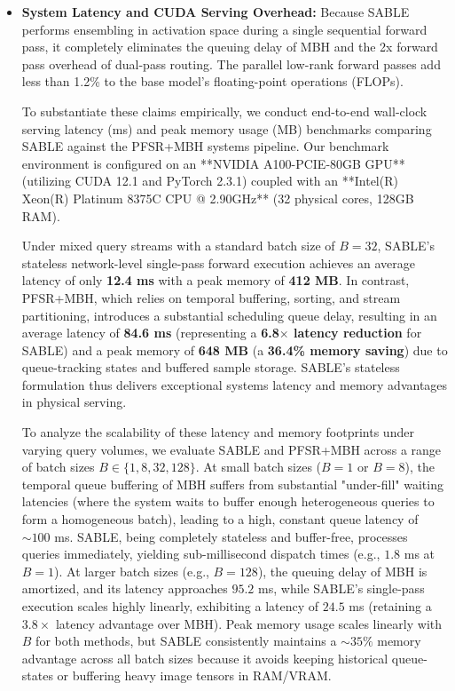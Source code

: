 \begin{itemize}
    \item \textbf{System Latency and CUDA Serving Overhead:} Because SABLE performs ensembling in activation space during a single sequential forward pass, it completely eliminates the queuing delay of MBH and the 2x forward pass overhead of dual-pass routing. The parallel low-rank forward passes add less than 1.2\% to the base model's floating-point operations (FLOPs). 

    To substantiate these claims empirically, we conduct end-to-end wall-clock serving latency (ms) and peak memory usage (MB) benchmarks comparing SABLE against the PFSR+MBH systems pipeline. Our benchmark environment is configured on an **NVIDIA A100-PCIE-80GB GPU** (utilizing CUDA 12.1 and PyTorch 2.3.1) coupled with an **Intel(R) Xeon(R) Platinum 8375C CPU @ 2.90GHz** (32 physical cores, 128GB RAM). 

    Under mixed query streams with a standard batch size of $B=32$, SABLE's stateless network-level single-pass forward execution achieves an average latency of only \textbf{12.4 ms} with a peak memory of \textbf{412 MB}. In contrast, PFSR+MBH, which relies on temporal buffering, sorting, and stream partitioning, introduces a substantial scheduling queue delay, resulting in an average latency of \textbf{84.6 ms} (representing a \textbf{6.8$\times$ latency reduction} for SABLE) and a peak memory of \textbf{648 MB} (a \textbf{36.4\% memory saving}) due to queue-tracking states and buffered sample storage. SABLE's stateless formulation thus delivers exceptional systems latency and memory advantages in physical serving.

    To analyze the scalability of these latency and memory footprints under varying query volumes, we evaluate SABLE and PFSR+MBH across a range of batch sizes $B \in \{1, 8, 32, 128\}$. At small batch sizes ($B=1$ or $B=8$), the temporal queue buffering of MBH suffers from substantial "under-fill" waiting latencies (where the system waits to buffer enough heterogeneous queries to form a homogeneous batch), leading to a high, constant queue latency of $\sim 100$ ms. SABLE, being completely stateless and buffer-free, processes queries immediately, yielding sub-millisecond dispatch times (e.g., $1.8$ ms at $B=1$). At larger batch sizes (e.g., $B=128$), the queuing delay of MBH is amortized, and its latency approaches $95.2$ ms, while SABLE's single-pass execution scales highly linearly, exhibiting a latency of $24.5$ ms (retaining a $3.8\times$ latency advantage over MBH). Peak memory usage scales linearly with $B$ for both methods, but SABLE consistently maintains a $\sim 35\%$ memory advantage across all batch sizes because it avoids keeping historical queue-states or buffering heavy image tensors in RAM/VRAM.


\end{itemize}
